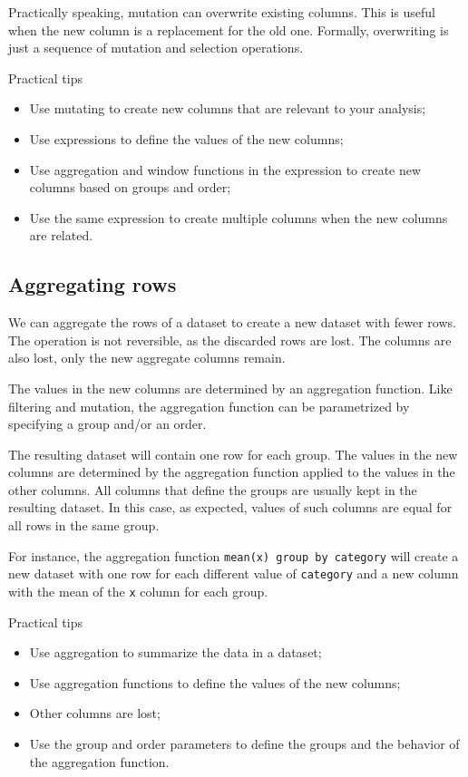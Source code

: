 Practically speaking, mutation can overwrite existing columns.  This is useful when the
new column is a replacement for the old one.  Formally, overwriting is just a sequence of
mutation and selection operations.

\begin{hlbox}{Practical tips}
  \begin{itemize}
    \item Use mutating to create new columns that are relevant to your analysis;
    \item Use expressions to define the values of the new columns;
    \item Use aggregation and window functions in the expression to create new columns based on
      groups and order;
    \item Use the same expression to create multiple columns when the new columns are related.
  \end{itemize}
\end{hlbox}

\subsection{Aggregating rows}

We can aggregate the rows of a dataset to create a new dataset with fewer rows.    The
operation is not reversible, as the discarded rows are lost.  The columns are also lost,
only the new aggregate columns remain.

The values in the new columns are determined by an aggregation function.  Like filtering
and mutation, the aggregation function can be parametrized by specifying a group and/or an
order.

The resulting dataset will contain one row for each group.  The values in the new columns
are determined by the aggregation function applied to the values in the other columns.
All columns that define the groups are usually kept in the resulting dataset.  In this
case, as expected, values of such columns are equal for all rows in the same group.

For instance, the aggregation function \texttt{mean(x) group by category} will create a
new dataset with one row for each different value of \texttt{category} and a new column
with the mean of the \texttt{x} column for each group.

\begin{hlbox}{Practical tips}
  \begin{itemize}
    \item Use aggregation to summarize the data in a dataset;
    \item Use aggregation functions to define the values of the new columns;
    \item Other columns are lost;
    \item Use the group and order parameters to define the groups and the behavior of the
      aggregation function.
  \end{itemize}
\end{hlbox}

